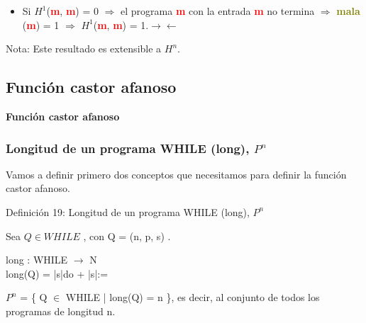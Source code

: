 \documentclass[xcolor=table]{beamer}
\begin{document}
\begin{frame}[fragile]
\begin{itemize}
    \item Si $H^1$(\textbf{\textcolor{red}{m}}, \textbf{\textcolor{red}{m}}) = 0 $\Rightarrow$ el programa \textbf{\textcolor{red}{m}} con la entrada \textbf{\textcolor{red}{m}} no termina $\Rightarrow$  \textbf{\textcolor{olive}{mala}} (\textbf{\textcolor{red}{m}}) = 1 $\Rightarrow$ $H^1$(\textbf{\textcolor{red}{m}}, \textbf{\textcolor{red}{m}}) = 1.$\rightarrow \leftarrow$
\end{itemize}


Nota: Este resultado es extensible a $H^n$.
\end{frame}
\subsection{Función castor afanoso}
\begin{frame}  \Large

\begin{center}
    \textbf{Función castor afanoso }
\end{center}

\end{frame} 

\begin{frame}[fragile]\frametitle{Longitud de un programa WHILE (long), $P^n$} \scriptsize

Vamos a definir primero dos conceptos que necesitamos para definir la función castor afanoso.

\begin{block}{Definición 19: Longitud de un programa WHILE (long), $P^n$ }
\end{block}
Sea $Q\in WHILE$ , con Q = (n, p, s) .

long : WHILE $\rightarrow$ N\\
long(Q) = |s|do + |s|:=

\vspace{0.3cm}
$P^n$ = \{ Q $\in$ WHILE | long(Q) = n \}, es decir, al conjunto de todos los programas de longitud n.



\end{frame}
\end{document}
